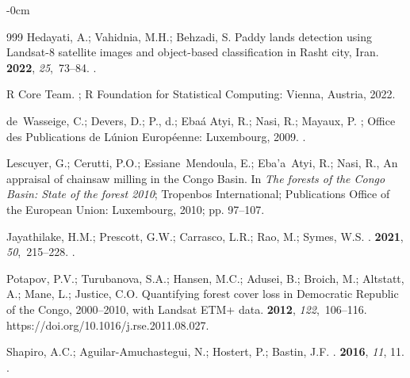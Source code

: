\documentclass[applsci,article,accept,pdftex,moreauthors]{Definitions/mdpi}
\begin{document}
\begin{adjustwidth}{-\extralength}{0cm}
\begin{thebibliography}{999}
Hedayati, A.; Vahidnia, M.H.; Behzadi, S.
\newblock Paddy lands detection using Landsat-8 satellite images and
  object-based classification in Rasht city, Iran.
 {\bf
  2022}, {\em 25},~73--84.
.

{R Core Team}.
;
\newblock R Foundation for Statistical Computing: Vienna, Austria,  2022.

de~Wasseige, C.; Devers, D.; P., d.; {Eba\'a Atyi}, R.; Nasi, R.; Mayaux, P.
; Office
  des Publications de L\'union Européenne: Luxembourg, %
 2009.
.

Lescuyer, G.; Cerutti, P.O.; Essiane~Mendoula, E.; Eba'a~Atyi, R.; Nasi, R.,
  {An appraisal of chainsaw milling in the Congo Basin}.
\newblock In {\em {The forests of the Congo Basin: State of the forest 2010}};
  Tropenbos International; Publications Office of the European Union:
  Luxembourg,  2010; pp. 97--107.

Jayathilake, H.M.; Prescott, G.W.; Carrasco, L.R.; Rao, M.; Symes, W.S.
.
 {\bf 2021}, {\em 50},~215--228.
.

Potapov, P.V.; Turubanova, S.A.; Hansen, M.C.; Adusei, B.; Broich, M.;
  Altstatt, A.; Mane, L.; Justice, C.O.
\newblock Quantifying forest cover loss in Democratic Republic of the Congo,
  2000--2010, with Landsat ETM+ data.
 {\bf 2012}, {\em 122},~106--116. {{https://doi.org/10.1016/j.rse.2011.08.027}}.

Shapiro, A.C.; Aguilar-Amuchastegui, N.; Hostert, P.; Bastin, J.F.
.
 {\bf 2016}, {\em 11}, 11.
.


\end{thebibliography}
\end{adjustwidth}
\end{document}
